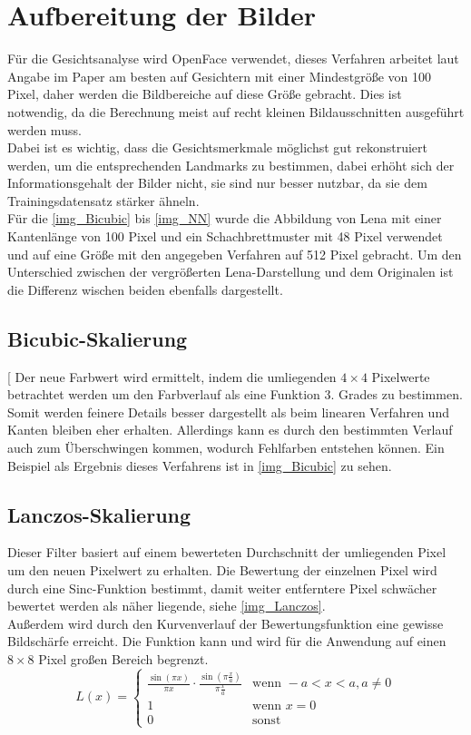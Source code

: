 \section{Aufbereitung der Bilder}
\label{scale_Algos}
Für die Gesichtsanalyse wird OpenFace verwendet, dieses Verfahren arbeitet laut Angabe im Paper \cite{OpenFace} am besten auf Gesichtern mit einer Mindestgröße von 100 Pixel, daher werden die Bildbereiche auf diese Größe gebracht. Dies ist notwendig, da die Berechnung meist auf recht kleinen Bildausschnitten ausgeführt werden muss.\\
Dabei ist es wichtig, dass die Gesichtsmerkmale möglichst gut rekonstruiert werden, um die entsprechenden Landmarks zu bestimmen, dabei erhöht sich der Informationsgehalt der Bilder nicht, sie sind nur besser nutzbar, da sie dem Trainingsdatensatz stärker ähneln.\\
Für die \autoref{img_Bicubic} bis \ref{img_NN} wurde die Abbildung von Lena mit einer Kantenlänge von 100 Pixel und ein Schachbrettmuster mit 48 Pixel verwendet und auf eine Größe mit den angegeben Verfahren auf 512 Pixel gebracht. Um den Unterschied zwischen der vergrößerten Lena-Darstellung und dem Originalen ist die Differenz wischen beiden ebenfalls dargestellt.
\subsection{Bicubic-Skalierung}[
Der neue Farbwert wird ermittelt, indem die umliegenden $4\times 4$ Pixelwerte betrachtet werden um den Farbverlauf als eine Funktion 3. Grades zu bestimmen. Somit werden feinere Details besser dargestellt als beim linearen Verfahren und Kanten bleiben eher erhalten. Allerdings kann es durch den bestimmten Verlauf auch zum Überschwingen kommen, wodurch Fehlfarben entstehen können. Ein Beispiel als Ergebnis dieses Verfahrens ist in \autoref{img_Bicubic} zu sehen. \cite{wiki_Bicubic}
\subsection{Lanczos-Skalierung}
Dieser Filter basiert auf einem bewerteten Durchschnitt der umliegenden Pixel um den neuen Pixelwert zu erhalten. Die Bewertung der einzelnen Pixel wird durch eine Sinc-Funktion bestimmt, damit weiter entferntere Pixel schwächer bewertet werden als näher liegende, siehe \autoref{img_Lanczos}.\\
Außerdem wird durch den Kurvenverlauf der Bewertungsfunktion eine gewisse Bildschärfe erreicht. Die Funktion kann und wird für die Anwendung auf einen $8\times 8$ Pixel großen Bereich begrenzt. \cite{wiki_Lanczos}
\[ L(x)= \left\{ \begin{array}{ll}
\frac{\sin(\pi x)}{\pi x} \cdot \frac{\sin(\pi \frac{x}{a})}{\pi \frac{x}{a}} & \textrm{wenn } -a < x <a, a\ne 0\\
1 & \textrm{wenn } x = 0\\
0 & \textrm{sonst}
\end{array}\right. \]
